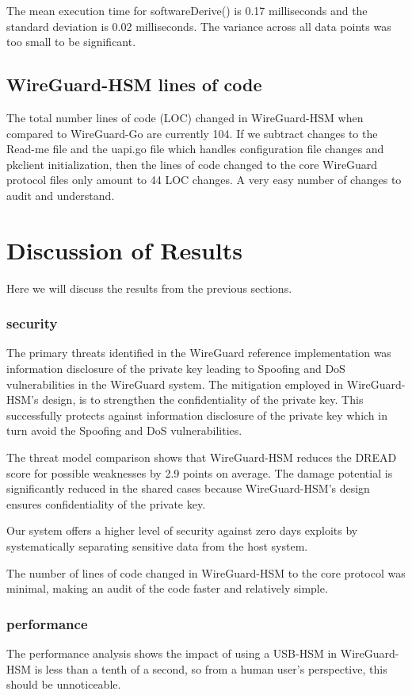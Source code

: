 \documentclass [11pt, proquest] {uwthesis}[2020/02/24]
\begin{document}
The mean execution time for softwareDerive() is 0.17 milliseconds and the standard deviation is 0.02 milliseconds. The variance across all data points was too small to be significant.

\section{WireGuard-HSM lines of code}
The total number lines of code (LOC) changed in WireGuard-HSM when compared to WireGuard-Go are currently 104. If we subtract changes to the Read-me file and the uapi.go file which handles configuration file changes and pkclient initialization, then the lines of code changed to the core WireGuard protocol files only amount to 44 LOC changes. A very easy number of changes to audit and understand.

\chapter {Discussion of Results}
Here we will discuss the results from the previous sections.

\subsection{security}
The primary threats identified in the WireGuard reference implementation was information disclosure of the private key leading to Spoofing and DoS vulnerabilities in the WireGuard system.
The mitigation employed in WireGuard-HSM's design, is to strengthen the confidentiality of the private key. This successfully protects against information disclosure of the private key which in turn avoid the Spoofing and DoS vulnerabilities.

The threat model comparison shows that WireGuard-HSM reduces the DREAD score for possible weaknesses by 2.9 points on average. The damage potential is significantly reduced in the shared cases because WireGuard-HSM's design ensures confidentiality of the private key.

Our system offers a higher level of security against zero days exploits by systematically separating sensitive data from the host system.

The number of lines of code changed in WireGuard-HSM to the core protocol was minimal, making an audit of the code faster and relatively simple.

\subsection{performance}
The performance analysis shows the impact of using a USB-HSM in  WireGuard-HSM is less than a tenth of a second, so from a human user's perspective, this should be unnoticeable.
\end{document}

